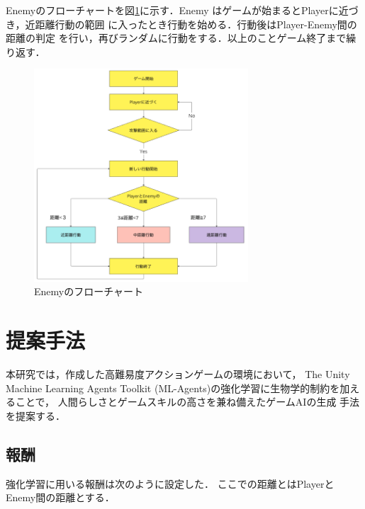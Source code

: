 \documentclass[a4paper,12pt,oneside,openany,titlepage]{jreport}
\begin{document}
 Enemyのフローチャートを図\ref{enemy_huro}に示す．Enemy
 はゲームが始まるとPlayerに近づき，近距離行動の範囲
 に入ったとき行動を始める．行動後はPlayer-Enemy間の距離の判定
 を行い，再びランダムに行動をする．以上のことゲーム終了まで繰り返す．
 
 \begin{figure}[h]
   \begin{center}
     \includegraphics[width=8cm]{enemy_huro.png}
     \caption{Enemyのフローチャート}
     \label{enemy_huro}
   \end{center}
 \end{figure}

\chapter{提案手法}
 \thispagestyle{fancy}
 \lhead{\leftmark}
 \rhead{\thepage}
 \renewcommand{\headrulewidth}{1pt}

 本研究では，作成した高難易度アクションゲームの環境において，
 The Unity Machine Learning Agents Toolkit
 (ML-Agents)の強化学習に生物学的制約を加えることで，
 人間らしさとゲームスキルの高さを兼ね備えたゲームAIの生成
 手法を提案する．
 
 \section{報酬}
 強化学習に用いる報酬は次のように設定した．
 ここでの距離とはPlayerとEnemy間の距離とする．
 
\end{document}
